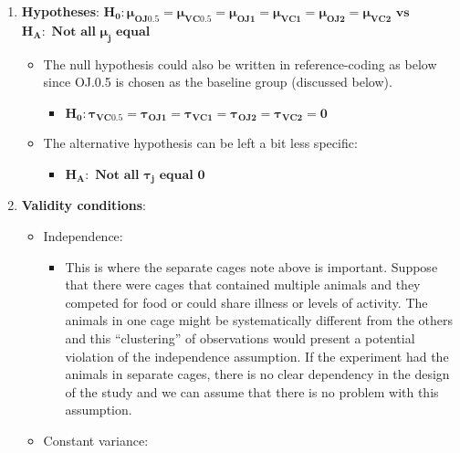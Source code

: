 \documentclass[]{book}
\providecommand{\tightlist}{%
  \setlength{\itemsep}{0pt}\setlength{\parskip}{0pt}}
\theoremstyle{definition}
\theoremstyle{definition}
\theoremstyle{remark}
\begin{document}
\begin{enumerate}
\def\labelenumi{\arabic{enumi}.}
\item
  \textbf{Hypotheses}:
  \(\boldsymbol{H_0: \mu_{OJ0.5} = \mu_{VC0.5} = \mu_{OJ1} = \mu_{VC1} = \mu_{OJ2} = \mu_{VC2}} \textbf{ vs }\)
  \(\boldsymbol{H_A:} \textbf{ Not all } \boldsymbol{\mu_j} \textbf{ equal}\)

  \begin{itemize}
  \item
    The null hypothesis could also be written in reference-coding as
    below since OJ.0.5 is chosen as the baseline group (discussed
    below).

    \begin{itemize}
    \tightlist
    \item
      \(\boldsymbol{H_0:\tau_{VC0.5}=\tau_{OJ1}=\tau_{VC1}=\tau_{OJ2}=\tau_{VC2}=0}\)
    \end{itemize}
  \item
    The alternative hypothesis can be left a bit less specific:

    \begin{itemize}
    \tightlist
    \item
      \(\boldsymbol{H_A:} \textbf{ Not all } \boldsymbol{\tau_j} \textbf{ equal 0}\)
    \end{itemize}
  \end{itemize}
\item
  \textbf{Validity conditions}:

  \begin{itemize}
  \item
    Independence:

    \begin{itemize}
    \tightlist
    \item
      This is where the separate cages note above is important. Suppose
      that there were cages that contained multiple animals and they
      competed for food or could share illness or levels of activity.
      The animals in one cage might be systematically different from the
      others and this ``clustering'' of observations would present a
      potential violation of the independence assumption. If the
      experiment had the animals in separate cages, there is no clear
      dependency in the design of the study and we can assume that there
      is no problem with this assumption.
    \end{itemize}
  \item
    Constant variance:


\end{itemize}
\end{enumerate}
\end{document}
